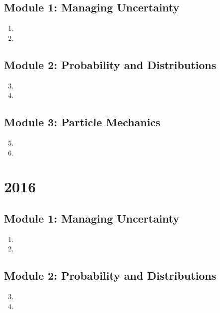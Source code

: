 \documentclass[fleqn,titlepage]{book}
\numberwithin{equation}{section}
\theoremstyle{plain}
\theoremstyle{definition}
\theoremstyle{remark}
\begin{document}
\section{Module 1: Managing Uncertainty}
\begin{enumerate}[label=\bfseries  \arabic*.]\setcounter{enumi}{0}
\item 
\item 
\end{enumerate}
\section{Module 2: Probability and Distributions}
\begin{enumerate}[label=\bfseries  \arabic*.]\setcounter{enumi}{2}
\item 
\item 
\end{enumerate}
\section{Module 3: Particle Mechanics}
\begin{enumerate}[label=\bfseries  \arabic*.]\setcounter{enumi}{4}
\item 
\item 
\end{enumerate}

\chapter{2016}
\section{Module 1: Managing Uncertainty}
\begin{enumerate}[label=\bfseries  \arabic*.]\setcounter{enumi}{0}
\item 
\item 
\end{enumerate}
\section{Module 2: Probability and Distributions}
\begin{enumerate}[label=\bfseries  \arabic*.]\setcounter{enumi}{2}
\item 
\item 
\end{enumerate}
\end{document}

